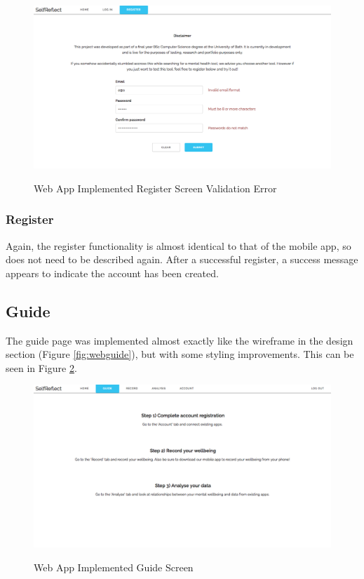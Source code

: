 \documentclass[11pt,openright,a4paper]{report}
\begin{document}
\begin{figure}[ht]
\centering
\caption{Web App Implemented Register Screen Validation Error}
\includegraphics[width=.8\textwidth]{i/webregistererror.png}
\label{fig:webregistererror}
\end{figure}


\subsubsection{Register}
Again, the register functionality is almost identical to that of the mobile app, so does not need to be described again. After a successful register, a success message appears to indicate the account has been created.

\subsection{Guide} \label{subsec:guide}
The guide page was implemented almost exactly like the wireframe in the design section (Figure \ref{fig:webguide}), but with some styling improvements. This can be seen in Figure \ref{fig:webguideimpl}.

\begin{figure}[ht]
\centering
\caption{Web App Implemented Guide Screen}
\includegraphics[width=.8\textwidth]{i/webguideimpl.png}
\label{fig:webguideimpl}
\end{figure}
\end{document}
